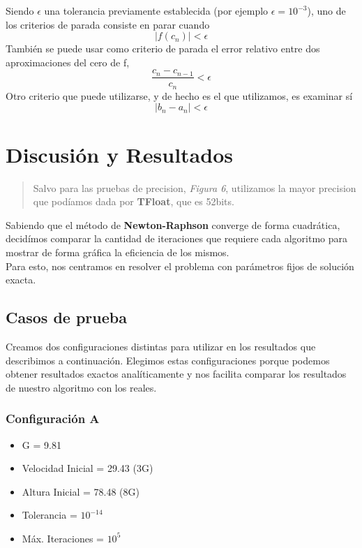 \documentclass[a4paper]{article}
\begin{document}
Siendo $\epsilon$ una tolerancia previamente establecida (por ejemplo $\epsilon = 10^{-3}$), uno de los criterios de parada consiste en parar cuando 
\begin{equation}|f(c_n)| < \epsilon \end{equation}
También se puede usar como criterio de parada el error relativo entre dos aproximaciones del cero de f, 
\begin{equation}\frac{c_n - c_{n-1}}{c_n} < \epsilon \end{equation}
Otro criterio que puede utilizarse, y de hecho es el que utilizamos, es examinar sí \begin{equation}\vert{b_n - a_n}\vert < \epsilon\end{equation}

\newpage
\section{Discusión y Resultados}
\begin{quote}
Salvo para las pruebas de precision, \textit{Figura 6}, utilizamos la mayor precision que podíamos dada por \textbf{TFloat}, que es 52bits.
\end{quote}
\vspace{1em}

Sabiendo que el método de \textbf{Newton-Raphson} converge de forma cuadrática, decidímos comparar la cantidad de iteraciones que requiere cada algoritmo para mostrar de forma gráfica la eficiencia de los mismos. \\

Para esto, nos centramos en resolver el problema con parámetros fijos de solución exacta.

\subsection{Casos de prueba}
 Creamos dos configuraciones distintas para utilizar en los resultados que describimos a continuación.
Elegimos estas configuraciones porque podemos obtener resultados exactos analíticamente y nos facilita comparar los resultados de nuestro algoritmo con los reales.

\subsubsection{Configuración A} 
\begin{itemize}
  \item{G = 9.81}
  \item{Velocidad Inicial = 29.43 (3G)} 
  \item{Altura Inicial = 78.48 (8G)} 
  \item{Tolerancia = $10^{-14}$} 
  \item{Máx. Iteraciones = $10^5$}
\end{itemize}
\end{document}
